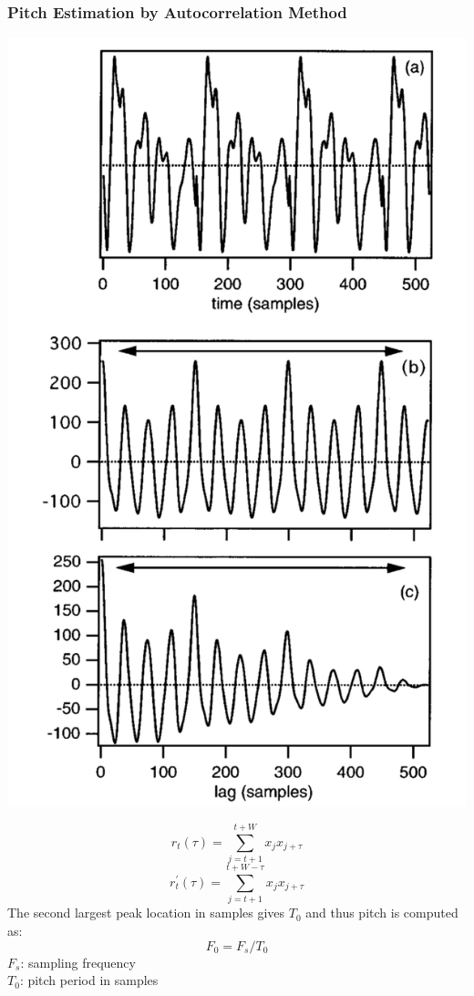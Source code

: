 \documentclass{beamer}
\begin{document}
\begin{frame}
\frametitle{Pitch Estimation by Autocorrelation Method}

\begin{minipage}{0.4\textwidth}
\includegraphics[width=\linewidth]{Image/Autocorreltation_3.png}
\end{minipage}
\begin{minipage}{0.5\textwidth}
\begin{equation}
r_t(\tau)=\sum_{j=t+1}^{t+W}x_{j}x_{j+\tau}
\end{equation}
\begin{equation}
r_{t}^{'}(\tau)=\sum_{j=t+1}^{t+W-\tau}x_{j}x_{j+\tau}
\end{equation}
The second largest peak location in samples gives $T_0$ and thus pitch is computed as:\\
\begin{equation}
F_0= F_s / T_0
\end{equation}
$F_s$: sampling frequency\\
$T_0$: pitch period in samples


\end{minipage}
\end{frame}
\end{document}
